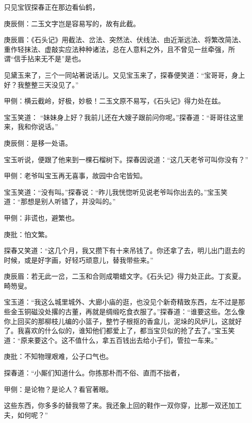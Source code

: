 \begin{parag}
    只见宝钗探春正在那边看仙鹤，\begin{note}庚辰侧：二玉文字岂是容易写的，故有此截。\end{note}\begin{note}庚辰眉：《石头记》用截法、岔法、突然法、伏线法、由近渐远法、将繁改简法、重作轻抹法、虚敲实应法种种诸法，总在人意料之外，且不曾见一丝牵强，所谓“信手拈来无不是”是也。\end{note}见黛玉来了，三个一同站著说话儿。又见宝玉来了，探春便笑道：“宝哥哥，身上好？我整整三天没见了。”\begin{note}甲侧：横云截岭，好极，妙极！二玉文原不易写，《石头记》得力处在兹。\end{note}宝玉笑道： “妹妹身上好？我前儿还在大嫂子跟前问你呢。”探春道：“哥哥往这里来，我和你说话。”\begin{note}庚辰侧：是移一处语。\end{note}宝玉听说，便跟了他来到一棵石榴树下。探春因说道：“这几天老爷可叫你没有？”\begin{note}甲侧：老爷叫宝玉再无喜事，故园中合宅皆知。\end{note}宝玉笑道：“没有叫。”探春说：“昨儿我恍惚听见说老爷叫你出去的。”宝玉笑道：“那想是别人听错了，并没叫的。”\begin{note}甲侧：非谎也，避繁也。\end{note}\begin{note}庚批：怕文繁。\end{note}探春又笑道：“这几个月，我又攒下有十来吊钱了。你还拿了去，明儿出门逛去的时候，或是好字画，好轻巧顽意儿，替我带些来。”\begin{note}庚辰眉：若无此一岔，二玉和合则成嚼蜡文字。《石头记》得力处正此。丁亥夏。畸笏叟。\end{note}宝玉道：“我这么城里城外、大廊小庙的逛，也没见个新奇精致东西，左不过是那些金玉铜磁没处撂的古董，再就是绸缎吃食衣服了。”探春道：“谁要这些。怎么像你上回买的那柳枝儿编的小篮子，整竹子根抠的香盒儿，泥垛的风炉儿，这就好了。我喜欢的什么似的，谁知他们都爱上了，都当宝贝似的抢了去了。”宝玉笑道：“原来要这个。这不值什么，拿五百钱出去给小子们，管拉一车来。”\begin{note}庚批：不知物理艰难，公子口气也。\end{note}探春道：“小厮们知道什么。你拣那朴而不俗、直而不拙者，\begin{note}甲侧：是论物？是论人？看官著眼。\end{note}这些东西，你多多的替我带了来。我还象上回的鞋作一双你穿，比那一双还加工夫，如何呢？”
\end{parag}



